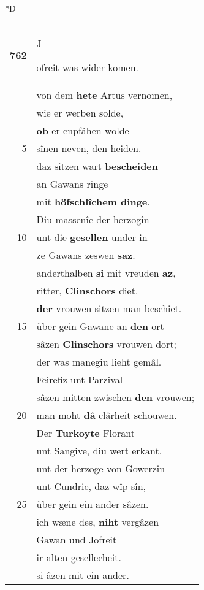 \documentclass[8pt,a4paper,notitlepage]{article}
\begin{document}
\begin{table}[ht]
\begin{minipage}[t]{0.5\linewidth}
\small
\begin{center}*D
\end{center}
\begin{tabular}{rl}
\textbf{762} & \begin{large}J\end{large}ofreit was wider komen.\\ 
 & von dem \textbf{hete} Artus vernomen,\\ 
 & wie er werben solde,\\ 
 & \textbf{ob} er enpfâhen wolde\\ 
5 & sînen neven, den heiden.\\ 
 & daz sitzen wart \textbf{bescheiden}\\ 
 & an Gawans ringe\\ 
 & mit \textbf{höfschlîchem dinge}.\\ 
 & Diu massenîe der herzogîn\\ 
10 & unt die \textbf{gesellen} under in\\ 
 & ze Gawans zeswen \textbf{saz}.\\ 
 & anderthalben \textbf{si} mit vreuden \textbf{az},\\ 
 & ritter, \textbf{Clinschors} diet.\\ 
 & \textbf{der} vrouwen sitzen man beschiet.\\ 
15 & über gein Gawane an \textbf{den} ort\\ 
 & sâzen \textbf{Clinschors} vrouwen dort;\\ 
 & der was manegiu lieht gemâl.\\ 
 & Feirefiz unt Parzival\\ 
 & sâzen mitten zwischen \textbf{den} vrouwen;\\ 
20 & man moht \textbf{dâ} clârheit schouwen.\\ 
 & Der \textbf{Turkoyte} Florant\\ 
 & unt Sangive, diu wert erkant,\\ 
 & unt der herzoge von Gowerzin\\ 
 & unt Cundrie, daz wîp sîn,\\ 
25 & über gein ein ander sâzen.\\ 
 & ich wæne des, \textbf{niht} vergâzen\\ 
 & Gawan und Jofreit\\ 
 & ir alten gesellecheit.\\ 
 & si âzen mit ein ander.\\ 

\end{tabular}
\end{minipage}
\end{table}
\end{document}
